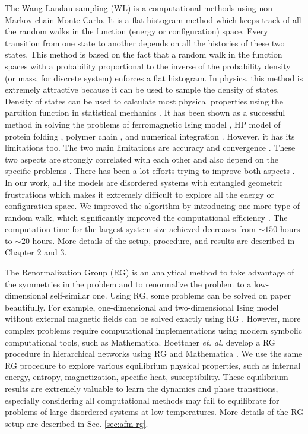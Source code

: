 The Wang-Landau sampling (WL) \cite{Wang2001} is a computational methods using non-Markov-chain Monte Carlo. It is a flat histogram method which keeps track of all the random walks in the function (energy or configuration) space. Every transition from one state to another depends on all the histories of these two states. This method is based on the fact that a random walk in the function spaces with a probability proportional to the inverse of the probability density (or mass, for discrete system) enforces a flat histogram. In physics, this method is extremely attractive because it can be used to sample the density of states. Density of states can be used to calculate most physical properties using the partition function in statistical mechanics \cite{gould2010statistical}. It has been shown as a successful method in solving the problems of ferromagnetic Ising model \cite{landau2004new}, HP model of protein folding \cite{wust2008hp}, polymer chain \cite{taylor2009phase}, and numerical integration \cite{li2007numerical}. However, it has its limitations too. The two main limitations are accuracy and convergence \cite{morozov2007accuracy}. These two aspects are strongly correlated with each other and also depend on the specific problems \cite{landau2014guide, wust2008hp}. There has been a lot efforts trying to improve both aspects \cite{schulz2003avoiding, schulz2003avoiding, troster2005wang}. In our work, all the models are disordered systems with entangled geometric frustrations which makes it extremely difficult to explore all the energy or configuration space. We improved the algorithm by introducing one more type of random walk, which significantly improved the computational efficiency \cite{cheng2015jamming}. The computation time for the largest system size achieved decreases from $\sim 150$ hours to $\sim 20$ hours. More details of the setup, procedure, and results are described in Chapter 2 and 3.


The Renormalization Group (RG) \cite{wilson1975renormalization} is an analytical method to take advantage of the symmetries in the problem and to renormalize the problem to a low-dimensional self-similar one. Using RG, some problems can be solved on paper beautifully. For example, one-dimensional and two-dimensional Ising model without external magnetic fields can be solved exactly using RG \cite{onsager1944}. However, more complex problems require computational implementations using modern symbolic computational tools, such as Mathematica.  Boettcher {\it et. al.} develop a RG procedure in hierarchical networks using RG and Mathematica \cite{boettcher2012ordinary, boettcher2011rgcp, BoHa11}. We use the same RG procedure to explore various equilibrium physical properties, such as internal energy, entropy, magnetization, specific heat, susceptibility. These equilibrium results are extremely valuable to learn the dynamics and phase transitions, especially considering all computational methods may fail to equilibrate for problems of large disordered systems at low temperatures. More details of the RG setup are described in Sec. \ref{sec:afm-rg}.










